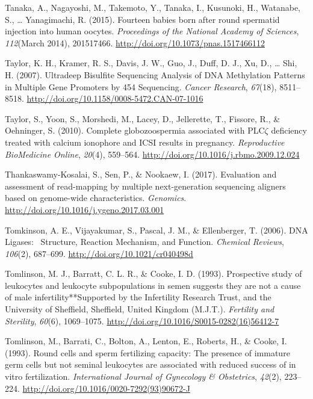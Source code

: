 \documentclass[12pt,twoside]{reedthesis}
\theoremstyle{definition}
\theoremstyle{definition}
\theoremstyle{remark}
\begin{document}
  \hypertarget{ref-Tanaka2015}{}
  Tanaka, A., Nagayoshi, M., Takemoto, Y., Tanaka, I., Kusunoki, H.,
  Watanabe, S., \ldots{} Yanagimachi, R. (2015). Fourteen babies born
  after round spermatid injection into human oocytes. \emph{Proceedings of
  the National Academy of Sciences}, \emph{112}(March 2014), 201517466.
  \url{http://doi.org/10.1073/pnas.1517466112}
  
  \hypertarget{ref-Taylor2007}{}
  Taylor, K. H., Kramer, R. S., Davis, J. W., Guo, J., Duff, D. J., Xu,
  D., \ldots{} Shi, H. (2007). Ultradeep Bisulfite Sequencing Analysis of
  DNA Methylation Patterns in Multiple Gene Promoters by 454 Sequencing.
  \emph{Cancer Research}, \emph{67}(18), 8511--8518.
  \url{http://doi.org/10.1158/0008-5472.CAN-07-1016}
  
  \hypertarget{ref-Taylor2010}{}
  Taylor, S., Yoon, S., Morshedi, M., Lacey, D., Jellerette, T., Fissore,
  R., \& Oehninger, S. (2010). Complete globozoospermia associated with
  PLC\(\zeta\) deficiency treated with calcium ionophore and ICSI results
  in pregnancy. \emph{Reproductive BioMedicine Online}, \emph{20}(4),
  559--564. \url{http://doi.org/10.1016/j.rbmo.2009.12.024}
  
  \hypertarget{ref-Thankaswamy-Kosalai2017}{}
  Thankaswamy-Kosalai, S., Sen, P., \& Nookaew, I. (2017). Evaluation and
  assessment of read-mapping by multiple next-generation sequencing
  aligners based on genome-wide characteristics. \emph{Genomics}.
  \url{http://doi.org/10.1016/j.ygeno.2017.03.001}
  
  \hypertarget{ref-Tomkinson2006}{}
  Tomkinson, A. E., Vijayakumar, S., Pascal, J. M., \& Ellenberger, T.
  (2006). DNA Ligases:~ Structure, Reaction Mechanism, and Function.
  \emph{Chemical Reviews}, \emph{106}(2), 687--699.
  \url{http://doi.org/10.1021/cr040498d}
  
  \hypertarget{ref-Tomlinson1993}{}
  Tomlinson, M. J., Barratt, C. L. R., \& Cooke, I. D. (1993). Prospective
  study of leukocytes and leukocyte subpopulations in semen suggests they
  are not a cause of male infertility**Supported by the Infertility
  Research Trust, and the University of Sheffield, Sheffield, United
  Kingdom (M.J.T.). \emph{Fertility and Sterility}, \emph{60}(6),
  1069--1075. \url{http://doi.org/10.1016/S0015-0282(16)56412-7}
  
  \hypertarget{ref-Tomlinson1993a}{}
  Tomlinson, M., Barrati, C., Bolton, A., Lenton, E., Roberts, H., \&
  Cooke, I. (1993). Round cells and sperm fertilizing capacity: The
  presence of immature germ cells but not seminal leukocytes are
  associated with reduced success of in vitro fertilization.
  \emph{International Journal of Gynecology \& Obstetrics}, \emph{42}(2),
  223--224. \url{http://doi.org/10.1016/0020-7292(93)90672-J}
  
\end{document}

